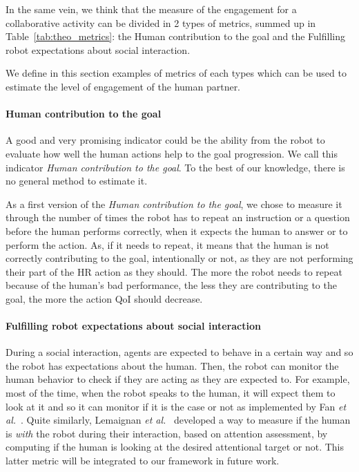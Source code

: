 \documentclass[a4paper,11pt,twoside]{StyleThese}
\begin{document}
In the same vein, we think that the measure of the engagement for a collaborative activity can be divided in 2 types of metrics, summed up in Table~\ref{tab:theo_metrics}: the Human contribution to the goal and the Fulfilling robot expectations about social interaction.

We define in this section examples of metrics of each types which can be used to estimate the level of engagement of the human partner. 

\paragraph{Human contribution to the goal}\label{subsubsec:h_contrib}

A good and very promising indicator could be the ability from the robot to evaluate how well the human actions help to the goal progression. We call this indicator \textit{Human contribution to the goal}. To the best of our knowledge, there is no general method to estimate it. 

As a first version of the \textit{Human contribution to the goal}, we chose to measure it through the number of times the robot has to repeat an instruction or a question before the human performs correctly, when it expects the human to answer or to perform the action. As, if it needs to repeat, it means that the human is not correctly contributing to the goal, intentionally or not, as they are not performing their part of the HR action as they should. The more the robot needs to repeat because of the human's bad performance, the less they are contributing to the goal, the more the action QoI should decrease. 

\paragraph{Fulfilling robot expectations about social interaction}\label{subsubsec:r_exp}
During a social interaction, agents are expected to behave in a certain way and so the robot has expectations about the human. Then, the robot can monitor the human behavior to check if they are acting as they are expected to. For example, most of the time, when the robot speaks to the human, it will expect them to look at it and so it can monitor if it is the case or not as implemented by Fan \textit{et al.}~\cite{fan2017}. Quite similarly, Lemaignan \textit{et al.}~\cite{lemaignan2016} developed a way to measure if the human is \textit{with} the robot during their interaction, based on attention assessment, by computing if the human is looking at the desired attentional target or not. This latter metric will be integrated to our framework in future work.
\end{document}
